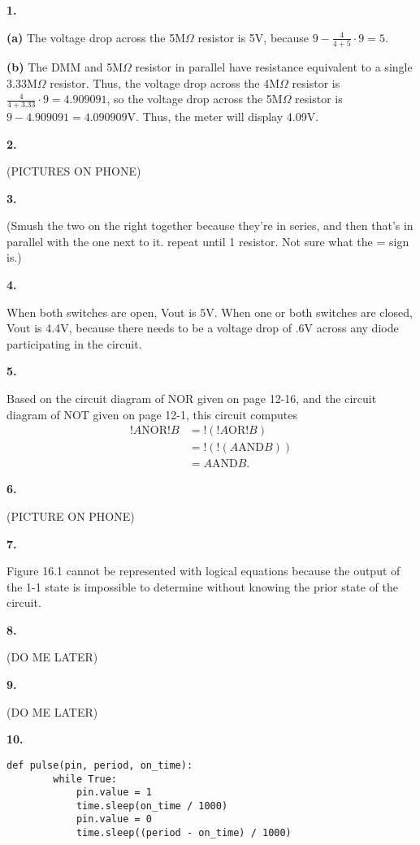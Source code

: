 \documentclass{article}
\begin{document}
\pagecolor{black}
\color{white}

\noindent\textbf{1.}

	\textbf{(a)} The voltage drop across the 5M$\Omega$ resistor is 5V, because $9 - \frac{4}{4+5} \cdot 9 = 5$.

	\textbf{(b)} The DMM and 5M$\Omega$ resistor in parallel have resistance equivalent to a single $3.33$M$\Omega$ resistor. Thus, the voltage drop across the 4M$\Omega$ resistor is $\frac4{4+3.33}\cdot9 = 4.909091$, so the voltage drop across the 5M$\Omega$ resistor is $9 - 4.909091 = 4.090909$V. Thus, the meter will display 4.09V.

\noindent\textbf{2.}

	(PICTURES ON PHONE)

\noindent\textbf{3.}

	(Smush the two on the right together because they're in series, and then that's in parallel with the one next to it. repeat until 1 resistor. Not sure what the = sign is.)

\noindent\textbf{4.}

	When both switches are open, Vout is 5V. When one or both switches are closed, Vout is 4.4V, because there needs to be a voltage drop of .6V across any diode participating in the circuit.

\noindent\textbf{5.}

	Based on the circuit diagram of NOR given on page 12-16, and the circuit diagram of NOT given on page 12-1, this circuit computes
	\begin{align*}
		!A \text{NOR} !B &= !(!A \text{OR} !B) \\
				 &= !(!(A \text{AND} B)) \\
				 &= A \text{AND} B.
	\end{align*}

\noindent\textbf{6.}

	(PICTURE ON PHONE)

\noindent\textbf{7.}

	Figure 16.1 cannot be represented with logical equations because the output of the 1-1 state is impossible to determine without knowing the prior state of the circuit.

\noindent\textbf{8.}

	(DO ME LATER)

\noindent\textbf{9.}

	(DO ME LATER)

\noindent\textbf{10.}

	\begin{verbatim}def pulse(pin, period, on_time):
	    while True:
	        pin.value = 1
	        time.sleep(on_time / 1000)
	        pin.value = 0
	        time.sleep((period - on_time) / 1000)
	\end{verbatim}
\end{document}
